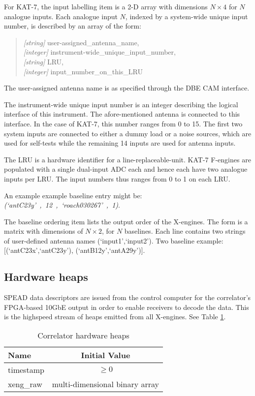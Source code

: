 \documentclass[11pt,english,twoside]{article}
\begin{document}
For KAT-7, the input labelling item is a 2-D array with dimensions $N\times4$ for $N$ analogue inputs. Each analogue input $N$, indexed by a
system-wide unique input number, is described by an array of the form:

\begin{quote}
\textit{[string]}  user-assigned\_antenna\_name, \\
\textit{[integer]} instrument-wide\_unique\_input\_number, \\
\textit{[string]}  LRU, \\
\textit{[integer]} input\_number\_on\_this\_LRU\\
\end{quote}
The user-assigned antenna name is as specified through the DBE CAM interface.

The instrument-wide unique input number is an integer describing the logical interface of this instrument. The afore-mentioned antenna is
connected to this interface. In the case of KAT-7, this number ranges from 0 to 15. The first two system inputs are connected to either a dummy
load or a noise sources, which are used for self-tests while the remaining 14 inputs are used for antenna inputs.

The LRU is a hardware identifier for a line-replaceable-unit. KAT-7 F-engines are populated with a single dual-input ADC each and hence each have two
analogue inputs per LRU. The input numbers thus ranges from 0 to 1 on each LRU.

An example example baseline entry might be: \textit{(`antC23y'~,~12~,~`roach030267'~,~1)}.

The baseline ordering item lists the output order of the X-engines. The form is a matrix with dimensions of $N\times2$, for $N$ baselines. Each
line contains two strings of user-defined antenna names (`input1',`input2'). Two baseline example: [(`antC23x',`antC23y'), (`antB12y',`antA29y')].


\subsection{Hardware heaps}
SPEAD data descriptors are issued from the control computer for the correlator's FPGA-based 10GbE output in order to enable receivers to decode
the data. This is the highspeed stream of heaps emitted from all X-engines. See Table \ref{tab:hw}.

\begin{table}[htbp]
\caption{Correlator hardware heaps}
\begin{center}
\begin{tabular}{|l|c|} \hline
{\bf Name} & {\bf Initial Value} \\ \hline
timestamp & $\geq 0$ \\ \hline
xeng\_raw & multi-dimensional binary array\\ \hline
\end{tabular}
\end{center}
\label{tab:hw}
\end{table}%
\end{document}
